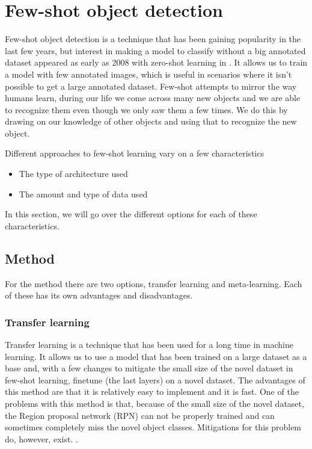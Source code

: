 

\section{Few-shot object detection}
Few-shot object detection is a technique that has been gaining popularity in the last few years, but interest in making a model to classify without a big annotated dataset appeared as early as 2008 with zero-shot learning in \citet{aaai08-132}. It allows us to train a model with few annotated images, which is useful in scenarios where it isn't possible to get a large annotated dataset. Few-shot attempts to mirror the way humans learn, during our life we come across many new objects and we are able to recognize them even though we only saw them a few times. We do this by drawing on our knowledge of other objects and using that to recognize the new object\cite{biederman1987recognition}. 

Different approaches to few-shot learning vary on a few characteristics
\begin{itemize}
	\item The type of architecture used
	\item The amount and type of data used
\end{itemize}

In this section, we will go over the different options for each of these characteristics.

\subsection{Method}

For the method there are two options, transfer learning and meta-learning. Each of these has its own advantages and disadvantages. %

\subsubsection*{Transfer learning}

Transfer learning is a technique that has been used for a long time in machine learning. It allows us to use a model that has been trained on a large dataset as a base and, with a few changes to mitigate the small size of the novel dataset in few-shot learning, finetune (the last layers) on a novel dataset. The advantages of this method are that it is relatively easy to implement and it is fast. One of the problems with this method is that, because of the small size of the novel dataset, the Region proposal network (RPN) can not be properly trained and can sometimes completely miss the novel object classes. Mitigations for this problem do, however, exist. \cite{DBLP:journals/corr/abs-2011-10142, VU2022104398, DBLP:journals/corr/abs-2105-09491, DBLP:journals/corr/abs-2103-05950,rs14143255}.

